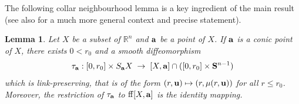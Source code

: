 \documentclass[11pt]{amsart}
\newtheorem{lemma}[theorem]{Lemma}
\newcommand{\field}[1]{\mathbb{#1}}
\newcommand{\R}{\field{R}}
\newcommand{\ba}{{\bf a}}
\newcommand{\bbl}{{\bf bl}}
\newcommand{\bS}{{\bf S}}
\newcommand{\bu}{{\bf u}}
\newcommand{\cX}{\mathcal{X}}
\newcommand{\ff}{{\rm ff}}
\newcommand{\Rn}{{\R^n}}
\numberwithin{equation}{section}
\numberwithin{equation}{section}
\begin{document}
	The following collar neighbourhood lemma is a key ingredient of the main result
(see also \cite[Theorem 1.2]{MeWu} for a much more general context and precise statement).
	\begin{lemma}\label{lem:collar-origin} 
		Let $X$ be a subset of $\Rn$ and $\ba$ be a point of $X$.
				If $\ba$ is a conic point of $X$, there exists 
		$0 < r_0$ and a smooth diffeomorphism
		$$
		\tau_\ba: [0,r_0] \times S_\ba X \; \to \; [X,\ba] \cap ([0,r_0]\times \bS^{n-1}) 
		$$
		which is link-preserving, that is of the form $(r,\bu) \mapsto (r,\mu(r,\bu))$ 
		for all $r\leq r_0$. Moreover, the restriction of $\tau_\ba$ to 
		$\ff[X,\ba]$ is the identity mapping. 
	\end{lemma}
\end{document}
